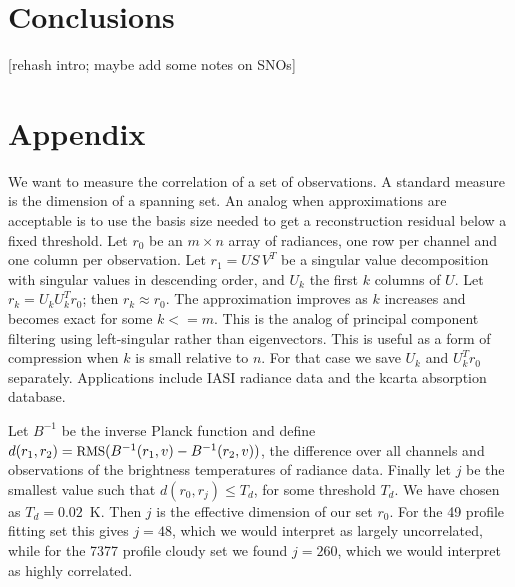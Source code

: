 \documentclass[11pt]{article}
\begin{document}
\FloatBarrier
\section{Conclusions}
\label{appcon}

[rehash intro; maybe add some notes on SNOs]

\FloatBarrier
\section{Appendix}
\label{append}

We want to measure the correlation of a set of observations.  A
standard measure is the dimension of a spanning set.  An analog when
approximations are acceptable is to use the basis size needed to get
a reconstruction residual below a fixed threshold.  Let $r_0$ be an
$m \times n$ array of radiances, one row per channel and one column
per observation.  Let $r_1 = U S\,V^T$ be a singular value
decomposition with singular values in descending order, and $U_k$
the first $k$ columns of $U$.  Let $r_k = U_k U_k^T r_0$; then $r_k
\approx r_0$.  The approximation improves as $k$ increases and
becomes exact for some $k <= m$.  This is the analog of principal
component filtering using left-singular rather than eigenvectors.
This is useful as a form of compression when $k$ is small relative
to $n$.  For that case we save $U_k$ and $U_k^T r_0$ separately.
Applications include IASI radiance data and the kcarta absorption
database.

Let $B^{-1}$ be the inverse Planck function and define $d(r_1, r_2)
= \mbox{\small RMS}(B^{-1}(r_1, v) - B^{-1}(r_2, v))$, the {\rms} difference over
all channels and observations of the brightness temperatures of
radiance data.  Finally let $j$ be the smallest value such that
$d(r_0, r_j) \le T_d$, for some threshold $T_d$.  We have chosen as
$T_d = 0.02$~K.  Then $j$ is the effective dimension of our set
$r_0$.  For the 49 profile fitting set this gives $j=48$, which we
would interpret as largely uncorrelated, while for the 7377 profile
cloudy set we found $j=260$, which we would interpret as highly
correlated.

\FloatBarrier


\end{document}
